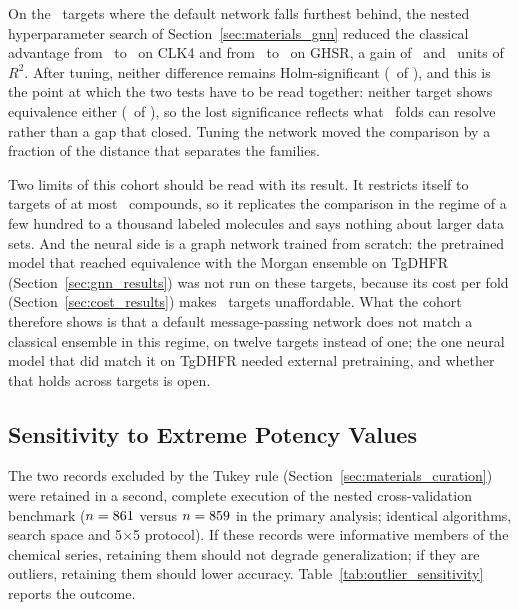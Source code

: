 On the \GenNTuned\ targets where the default network falls furthest behind, the nested hyperparameter search of
Section~\ref{sec:materials_gnn} reduced the classical advantage from \GenClkFourAdvRTwo\ to
\GenClkFourTunedAdvRTwo\ on CLK4 and from \GenGhsrAdvRTwo\ to \GenGhsrTunedAdvRTwo\ on GHSR, a gain of
\GenClkFourTuningGain\ and \GenGhsrTuningGain\ units of $R^2$. After tuning, neither difference remains
Holm-significant (\GenTunedNHolm\ of \GenNTuned), and this is the point at which the two tests have to be read
together: neither target shows equivalence either (\GenTunedNEquiv\ of \GenNTuned), so the lost significance
reflects what \GenTotalOuterFolds\ folds can resolve rather than a gap that closed. Tuning the network moved the
comparison by a fraction of the distance that separates the families.

Two limits of this cohort should be read with its result. It restricts itself to targets of at most
\GenMaxCompounds\ compounds, so it replicates the comparison in the regime of a few hundred to a thousand labeled
molecules and says nothing about larger data sets. And the neural side is a graph network trained from scratch: the
pretrained model that reached equivalence with the Morgan ensemble on TgDHFR (Section~\ref{sec:gnn_results}) was not
run on these targets, because its cost per fold (Section~\ref{sec:cost_results}) makes \GenNTargets\ targets
unaffordable. What the cohort therefore shows is that a default message-passing network does not match a classical
ensemble in this regime, on twelve targets instead of one; the one neural model that did match it on TgDHFR needed
external pretraining, and whether that holds across targets is open.

\subsection{Sensitivity to Extreme Potency Values}
\label{sec:outlier_sensitivity}

The two records excluded by the Tukey rule (Section~\ref{sec:materials_curation}) were retained in a second, complete execution of the nested cross-validation benchmark ($n = 861$ versus $n = 859$ in the primary analysis; identical algorithms, search space and 5$\times$5 protocol). If these records were informative members of the chemical series, retaining them should not degrade generalization; if they are outliers, retaining them should lower accuracy. Table~\ref{tab:outlier_sensitivity} reports the outcome.

